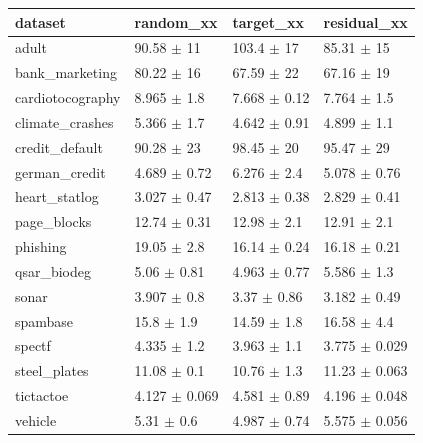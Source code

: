 \begin{tabular}{llll}
\toprule
dataset & random\_xx & target\_xx & residual\_xx \\
\midrule
adult & 90.58 $\pm$ 11 & 103.4 $\pm$ 17 & 85.31 $\pm$ 15 \\
bank\_marketing & 80.22 $\pm$ 16 & 67.59 $\pm$ 22 & 67.16 $\pm$ 19 \\
cardiotocography & 8.965 $\pm$ 1.8 & 7.668 $\pm$ 0.12 & 7.764 $\pm$ 1.5 \\
climate\_crashes & 5.366 $\pm$ 1.7 & 4.642 $\pm$ 0.91 & 4.899 $\pm$ 1.1 \\
credit\_default & 90.28 $\pm$ 23 & 98.45 $\pm$ 20 & 95.47 $\pm$ 29 \\
german\_credit & 4.689 $\pm$ 0.72 & 6.276 $\pm$ 2.4 & 5.078 $\pm$ 0.76 \\
heart\_statlog & 3.027 $\pm$ 0.47 & 2.813 $\pm$ 0.38 & 2.829 $\pm$ 0.41 \\
page\_blocks & 12.74 $\pm$ 0.31 & 12.98 $\pm$ 2.1 & 12.91 $\pm$ 2.1 \\
phishing & 19.05 $\pm$ 2.8 & 16.14 $\pm$ 0.24 & 16.18 $\pm$ 0.21 \\
qsar\_biodeg & 5.06 $\pm$ 0.81 & 4.963 $\pm$ 0.77 & 5.586 $\pm$ 1.3 \\
sonar & 3.907 $\pm$ 0.8 & 3.37 $\pm$ 0.86 & 3.182 $\pm$ 0.49 \\
spambase & 15.8 $\pm$ 1.9 & 14.59 $\pm$ 1.8 & 16.58 $\pm$ 4.4 \\
spectf & 4.335 $\pm$ 1.2 & 3.963 $\pm$ 1.1 & 3.775 $\pm$ 0.029 \\
steel\_plates & 11.08 $\pm$ 0.1 & 10.76 $\pm$ 1.3 & 11.23 $\pm$ 0.063 \\
tictactoe & 4.127 $\pm$ 0.069 & 4.581 $\pm$ 0.89 & 4.196 $\pm$ 0.048 \\
vehicle & 5.31 $\pm$ 0.6 & 4.987 $\pm$ 0.74 & 5.575 $\pm$ 0.056 \\
\bottomrule
\end{tabular}
